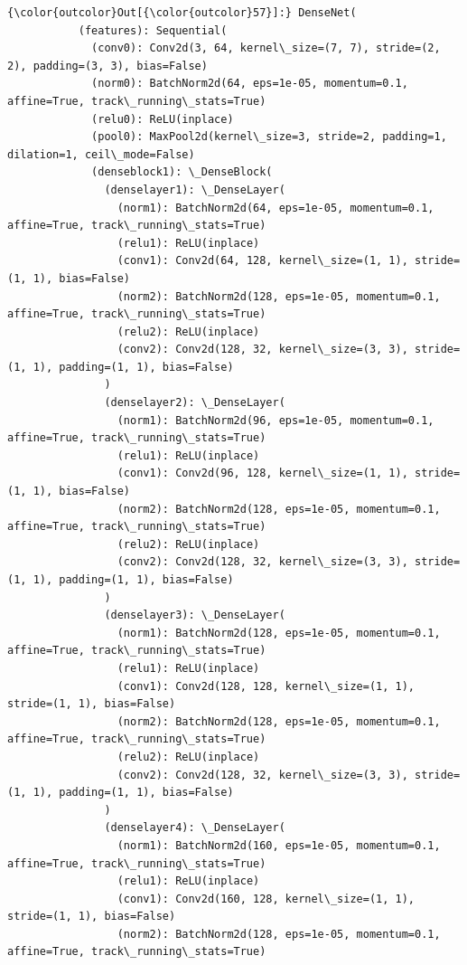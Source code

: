 \documentclass[11pt]{article}
\begin{document}
\begin{Verbatim}[commandchars=\\\{\}]
{\color{outcolor}Out[{\color{outcolor}57}]:} DenseNet(
           (features): Sequential(
             (conv0): Conv2d(3, 64, kernel\_size=(7, 7), stride=(2, 2), padding=(3, 3), bias=False)
             (norm0): BatchNorm2d(64, eps=1e-05, momentum=0.1, affine=True, track\_running\_stats=True)
             (relu0): ReLU(inplace)
             (pool0): MaxPool2d(kernel\_size=3, stride=2, padding=1, dilation=1, ceil\_mode=False)
             (denseblock1): \_DenseBlock(
               (denselayer1): \_DenseLayer(
                 (norm1): BatchNorm2d(64, eps=1e-05, momentum=0.1, affine=True, track\_running\_stats=True)
                 (relu1): ReLU(inplace)
                 (conv1): Conv2d(64, 128, kernel\_size=(1, 1), stride=(1, 1), bias=False)
                 (norm2): BatchNorm2d(128, eps=1e-05, momentum=0.1, affine=True, track\_running\_stats=True)
                 (relu2): ReLU(inplace)
                 (conv2): Conv2d(128, 32, kernel\_size=(3, 3), stride=(1, 1), padding=(1, 1), bias=False)
               )
               (denselayer2): \_DenseLayer(
                 (norm1): BatchNorm2d(96, eps=1e-05, momentum=0.1, affine=True, track\_running\_stats=True)
                 (relu1): ReLU(inplace)
                 (conv1): Conv2d(96, 128, kernel\_size=(1, 1), stride=(1, 1), bias=False)
                 (norm2): BatchNorm2d(128, eps=1e-05, momentum=0.1, affine=True, track\_running\_stats=True)
                 (relu2): ReLU(inplace)
                 (conv2): Conv2d(128, 32, kernel\_size=(3, 3), stride=(1, 1), padding=(1, 1), bias=False)
               )
               (denselayer3): \_DenseLayer(
                 (norm1): BatchNorm2d(128, eps=1e-05, momentum=0.1, affine=True, track\_running\_stats=True)
                 (relu1): ReLU(inplace)
                 (conv1): Conv2d(128, 128, kernel\_size=(1, 1), stride=(1, 1), bias=False)
                 (norm2): BatchNorm2d(128, eps=1e-05, momentum=0.1, affine=True, track\_running\_stats=True)
                 (relu2): ReLU(inplace)
                 (conv2): Conv2d(128, 32, kernel\_size=(3, 3), stride=(1, 1), padding=(1, 1), bias=False)
               )
               (denselayer4): \_DenseLayer(
                 (norm1): BatchNorm2d(160, eps=1e-05, momentum=0.1, affine=True, track\_running\_stats=True)
                 (relu1): ReLU(inplace)
                 (conv1): Conv2d(160, 128, kernel\_size=(1, 1), stride=(1, 1), bias=False)
                 (norm2): BatchNorm2d(128, eps=1e-05, momentum=0.1, affine=True, track\_running\_stats=True)

\end{Verbatim}
\end{document}
